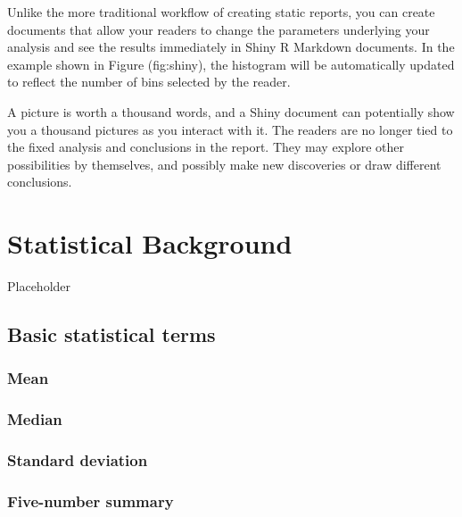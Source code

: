 \documentclass[12pt, krantz2,]{krantz}
\begin{document}
Unlike the more traditional workflow of creating static reports, you can create documents that allow your readers to change the parameters underlying your analysis and see the results immediately in Shiny R Markdown documents. In the example shown in Figure \citet{ref}(fig:shiny), the histogram will be automatically updated to reflect the number of bins selected by the reader.

A picture is worth a thousand words, and a Shiny document can potentially show you a thousand pictures as you interact with it. The readers are no longer tied to the fixed analysis and conclusions in the report. They may explore other possibilities by themselves, and possibly make new discoveries or draw different conclusions.

\hypertarget{appendix-appendix}{%
\appendix {}}


\hypertarget{appendixA}{%
\chapter{Statistical Background}\label{appendixA}}

Placeholder

\hypertarget{basic-statistical-terms}{%
\section{Basic statistical terms}\label{basic-statistical-terms}}

\hypertarget{mean}{%
\subsection{Mean}\label{mean}}

\hypertarget{median}{%
\subsection{Median}\label{median}}

\hypertarget{standard-deviation}{%
\subsection{Standard deviation}\label{standard-deviation}}

\hypertarget{five-number-summary}{%
\subsection{Five-number summary}\label{five-number-summary}}
\end{document}
